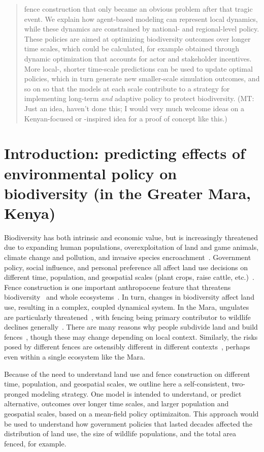 \documentclass{article}
\theoremstyle{mytheorem}
\theoremstyle{myremark}
\newcommand{\mt}[1]{{\textcolor{mt-orange} {({\tiny MT:} #1)}}}
\begin{document}
\begin{abstract}
  fence construction that only became an obvious problem after that tragic event.
  We explain how agent-based modeling can represent local dynamics, while these
  dynamics are constrained by national- and regional-level policy. These policies 
  are aimed at optimizing biodiversity outcomes over longer time scales, 
  which could be calculated, for example obtained through dynamic
  optimization that accounts for actor and stakeholder incentives. More local-,
  shorter time-scale predictions can be used to update optimal policies, which
  in turn generate new smaller-scale simulation outcomes, and so on so that
  the models at each scale contribute to a strategy for implementing long-term
  \emph{and} adaptive policy to protect biodiversity.
  \mt{Just an idea, haven't done this; I would very much welcome
  ideas on a Kenyan-focused or -inspired idea for a proof of concept like this.}
\end{abstract}


\section{Introduction: predicting effects of environmental policy on 
  biodiversity (in the Greater Mara, Kenya)}

Biodiversity has both intrinsic and economic value, but is increasingly threatened
due to expanding human populations, overexploitation of land and game animals,
climate change and pollution, and invasive species encroachment~\cite{Bellard2022}.
Government policy, social influence, and personal preference all affect land use
decisions on different time, population, and geospatial scales 
(plant crops, raise cattle, etc.)~\cite{Eitzel2020,Løvschal2021}.
Fence construction is one important anthropocene feature that threatens
biodiversity~\cite{Packer2013} and whole 
ecosystems~\cite{Løvschal2017,Løvschal2022}. 
In turn, changes in biodiversity affect land use, resulting in a complex, coupled
dynamical system. In the Mara, 
ungulates are particularly threatened~\cite{Ogutu2009}, with fencing being primary
contributor to wildlife declines generally~\cite{Ogutu2016}. 
There are many reasons why people subdivide land and build
fences~\cite{Mwangi2007}, though these may change depending on local context.
Similarly, the risks posed by different fences are ostensibly
different in different contexts~\cite{Bellard2022}, perhaps even within
a single ecosystem like the Mara. 

Because of the need to understand land use and
fence construction on different time, population, and geospatial scales, we
outline here a self-consistent, two-pronged modeling strategy. One 
model is intended to understand, or predict alternative, outcomes over 
longer time scales, and larger population and geospatial scales,
based on a mean-field policy optimizaiton. This approach would be used to 
understand how government policies that lasted decades affected the distribution of
land use, the size of wildlife populations, and the total area fenced, for example.
\end{document}
